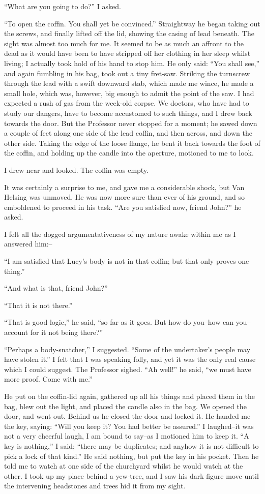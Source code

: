 \documentclass[12pt,openright]{book}
\begin{document}
“What are you going to do?” I asked.

“To open the coffin. You shall yet be convinced.” Straightway he began taking out the screws, and finally lifted off the lid, showing the casing of lead beneath. The sight was almost too much for me. It seemed to be as much an affront to the dead as it would have been to have stripped off her clothing in her sleep whilst living; I actually took hold of his hand to stop him. He only said: “You shall see,” and again fumbling in his bag, took out a tiny fret-saw. Striking the turnscrew through the lead with a swift downward stab, which made me wince, he made a small hole, which was, however, big enough to admit the point of the saw. I had expected a rush of gas from the week-old corpse. We doctors, who have had to study our dangers, have to become accustomed to such things, and I drew back towards the door. But the Professor never stopped for a moment; he sawed down a couple of feet along one side of the lead coffin, and then across, and down the other side. Taking the edge of the loose flange, he bent it back towards the foot of the coffin, and holding up the candle into the aperture, motioned to me to look.

I drew near and looked. The coffin was empty.

It was certainly a surprise to me, and gave me a considerable shock, but Van Helsing was unmoved. He was now more sure than ever of his ground, and so emboldened to proceed in his task. “Are you satisfied now, friend John?” he asked.

I felt all the dogged argumentativeness of my nature awake within me as I answered him:–

“I am satisfied that Lucy’s body is not in that coffin; but that only proves one thing.”

“And what is that, friend John?”

“That it is not there.”

“That is good logic,” he said, “so far as it goes. But how do you–how can you–account for it not being there?”

“Perhaps a body-snatcher,” I suggested. “Some of the undertaker’s people may have stolen it.” I felt that I was speaking folly, and yet it was the only real cause which I could suggest. The Professor sighed. “Ah well!” he said, “we must have more proof. Come with me.”

He put on the coffin-lid again, gathered up all his things and placed them in the bag, blew out the light, and placed the candle also in the bag. We opened the door, and went out. Behind us he closed the door and locked it. He handed me the key, saying: “Will you keep it? You had better be assured.” I laughed–it was not a very cheerful laugh, I am bound to say–as I motioned him to keep it. “A key is nothing,” I said; “there may be duplicates; and anyhow it is not difficult to pick a lock of that kind.” He said nothing, but put the key in his pocket. Then he told me to watch at one side of the churchyard whilst he would watch at the other. I took up my place behind a yew-tree, and I saw his dark figure move until the intervening headstones and trees hid it from my sight.
\end{document}

